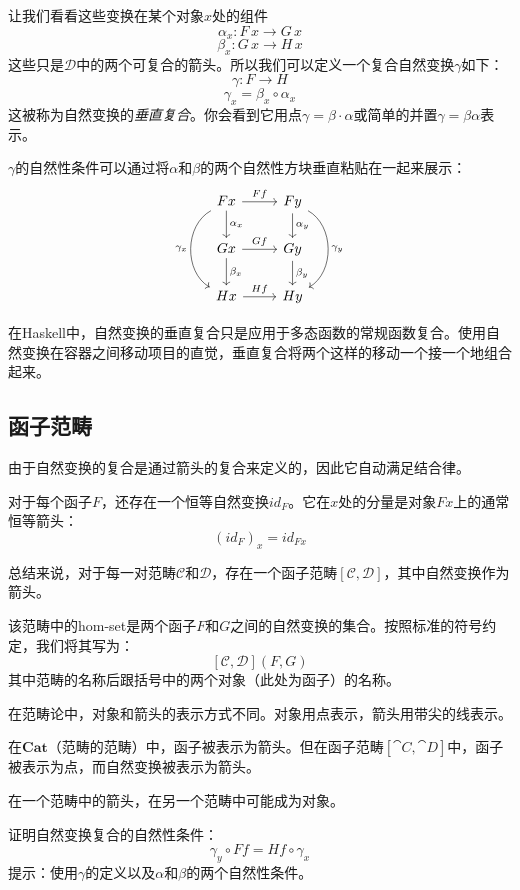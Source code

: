 \documentclass[DaoFP]{subfiles}
\begin{document}
让我们看看这些变换在某个对象$x$处的组件
\[ \alpha_x \colon F \, x \to G \, x \]
\[ \beta_x \colon G \, x \to H \, x \]
这些只是$\mathcal{D}$中的两个可复合的箭头。所以我们可以定义一个复合自然变换$\gamma$如下：
\[ \gamma \colon F \to H\]
\[ \gamma_x = \beta_x \circ \alpha_x \]
这被称为自然变换的\emph{垂直复合}。你会看到它用点$\gamma = \beta \cdot \alpha$或简单的并置$\gamma = \beta \alpha$表示。

$\gamma$的自然性条件可以通过将$\alpha$和$\beta$的两个自然性方块垂直粘贴在一起来展示：
\[
 \begin{tikzcd}
 F x
 \arrow[d, "\alpha_x"]
 \arrow[r, "F f"]
 \arrow[dd, bend right = 60, "\gamma_x"']
 &
F y
  \arrow[d, "\alpha_y"]
 \arrow[dd, bend left = 60, "\gamma_y"]
 \\
G x
 \arrow[r, "G f"]
 \arrow[d, "\beta_x"]
& G y
\arrow[d, "\beta_y"]
\\
H x
\arrow[r, "H f"]
& H y
 \end{tikzcd}
\]

在Haskell中，自然变换的垂直复合只是应用于多态函数的常规函数复合。使用自然变换在容器之间移动项目的直觉，垂直复合将两个这样的移动一个接一个地组合起来。

\subsection{函子范畴}

由于自然变换的复合是通过箭头的复合来定义的，因此它自动满足结合律。

对于每个函子$F$，还存在一个恒等自然变换$id_F$。它在$x$处的分量是对象$F x$上的通常恒等箭头：
\[ (id_F)_x = id_{F x} \]

总结来说，对于每一对范畴$\mathcal{C}$和$\mathcal{D}$，存在一个函子范畴$[\mathcal{C}, \mathcal{D}]$，其中自然变换作为箭头。

该范畴中的hom-set是两个函子$F$和$G$之间的自然变换的集合。按照标准的符号约定，我们将其写为：
\[ [\mathcal{C}, \mathcal{D}](F, G) \]
其中范畴的名称后跟括号中的两个对象（此处为函子）的名称。

在范畴论中，对象和箭头的表示方式不同。对象用点表示，箭头用带尖的线表示。

在$\mathbf{Cat}$（范畴的范畴）中，函子被表示为箭头。但在函子范畴$[\cat C, \cat D]$中，函子被表示为点，而自然变换被表示为箭头。

在一个范畴中的箭头，在另一个范畴中可能成为对象。


\begin{exercise}
证明自然变换复合的自然性条件：
\[ \gamma_y \circ F f = H f \circ \gamma_x \]
提示：使用$\gamma$的定义以及$\alpha$和$\beta$的两个自然性条件。
\end{exercise}
\end{document}
